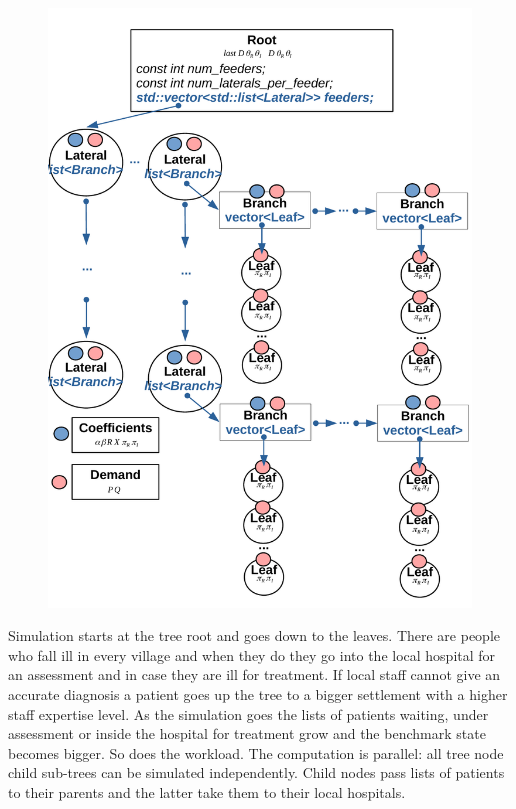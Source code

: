 \begin{figure}
\begin{minipage}{.5\textwidth}
  \centering
  \includegraphics[width=0.9\linewidth]{images/power_scheme.pdf}
  \label{fig:power_benchmark}
\end{minipage}
\end{figure}\newline\null
\quad Simulation starts at the tree root and goes down to the leaves. There are people who fall ill in every village and when they do they go into the local hospital for an assessment and in case they are ill for treatment. If local staff cannot give an accurate diagnosis a patient goes up the tree to a bigger settlement with a higher staff expertise level. As the simulation goes the lists of patients waiting, under assessment or inside the hospital for treatment grow and the benchmark state becomes bigger. So does the workload. The computation is parallel: all tree node child sub-trees can be simulated independently. Child nodes pass lists of patients to their parents and the latter take them to their local hospitals.\newline\null     
